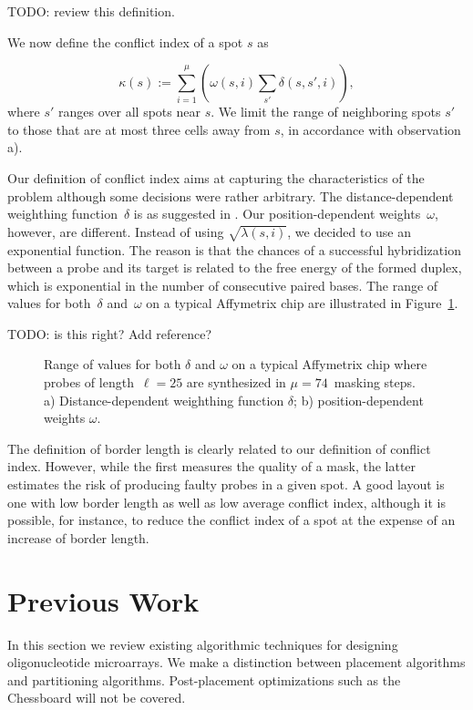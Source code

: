 \documentclass{bioinfo}
\begin{document}
TODO: review this definition.

We now define the conflict index of a spot $s$ as

\begin{equation}
\label{eq:conf_idx} \kappa(s) := \sum_{i=1}^{\mu} \left( \omega(s,i) \sum_{s'} \delta(s,s',i) \right),
\end{equation}
where $s'$ ranges over all spots near $s$. We limit the range of neighboring spots $s'$ to those that are at most three cells away from $s$, in accordance with observation a).

Our definition of conflict index aims at capturing the characteristics of the problem although some decisions were rather arbitrary. The distance-dependent weighthing function~$\delta$ is as suggested in \citealp{KAHNG03_1}. Our position-dependent weights~$\omega$, however, are different. Instead of using $\sqrt{\lambda(s,i)}$, we decided to use an exponential function. The reason is that the chances of a successful hybridization between a probe and its target is related to the free energy of the formed duplex, which is exponential in the number of consecutive paired bases. The range of values for both~$\delta$ and~$\omega$ on a typical Affymetrix chip are illustrated in Figure~\ref{fig:conflit_index_values}.

TODO: is this right? Add reference?

\begin{figure}
\caption{Range of values for both $\delta$ and $\omega$ on a typical Affymetrix chip where probes of length~$\ell = 25$ are synthesized in $\mu = 74$~masking steps. a) Distance-dependent weighthing function $\delta$; b) position-dependent weights $\omega$.}
\label{fig:conflit_index_values}
\end{figure}

The definition of border length is clearly related to our definition of conflict index. However, while the first measures the quality of a mask, the latter estimates the risk of producing faulty probes in a given spot. A good layout is one with low border length as well as low average conflict index, although it is possible, for instance, to reduce the conflict index of a spot at the expense of an increase of border length.

\section{Previous Work}

In this section we review existing algorithmic techniques for designing oligonucleotide microarrays. We make a distinction between placement algorithms and partitioning algorithms. Post-placement optimizations such as the Chessboard \citep{KAHNG02} will not be covered.
\end{document}
